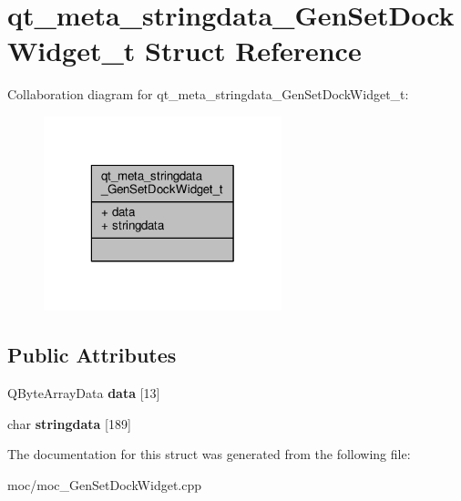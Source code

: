 \hypertarget{structqt__meta__stringdata___gen_set_dock_widget__t}{\section{qt\-\_\-meta\-\_\-stringdata\-\_\-\-Gen\-Set\-Dock\-Widget\-\_\-t Struct Reference}
\label{structqt__meta__stringdata___gen_set_dock_widget__t}
}


Collaboration diagram for qt\-\_\-meta\-\_\-stringdata\-\_\-\-Gen\-Set\-Dock\-Widget\-\_\-t\-:
\nopagebreak
\begin{figure}[H]
\begin{center}
\leavevmode
\includegraphics[width=196pt]{structqt__meta__stringdata___gen_set_dock_widget__t__coll__graph}
\end{center}
\end{figure}
\subsection*{Public Attributes}
\begin{DoxyCompactItemize}
\item 
\hypertarget{structqt__meta__stringdata___gen_set_dock_widget__t_a4928bacaabbc76ab9fd2242eddf32400}{Q\-Byte\-Array\-Data {\bfseries data} \mbox{[}13\mbox{]}}\label{structqt__meta__stringdata___gen_set_dock_widget__t_a4928bacaabbc76ab9fd2242eddf32400}

\item 
\hypertarget{structqt__meta__stringdata___gen_set_dock_widget__t_a5a30d174087b40693ce591b254eba5f4}{char {\bfseries stringdata} \mbox{[}189\mbox{]}}\label{structqt__meta__stringdata___gen_set_dock_widget__t_a5a30d174087b40693ce591b254eba5f4}

\end{DoxyCompactItemize}


The documentation for this struct was generated from the following file\-:\begin{DoxyCompactItemize}
\item 
moc/moc\-\_\-\-Gen\-Set\-Dock\-Widget.\-cpp\end{DoxyCompactItemize}
